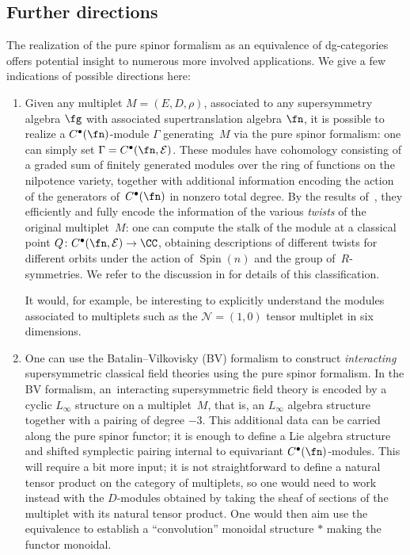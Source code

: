 \documentclass[10pt,a4paper]{amsart}
\numberwithin{equation}{section}
\def\cE{\mathcal E}\def\cF{\mathcal F}\def\cG{\mathcal G}\def\cH{\mathcal H}
\def\bu{\bullet}
\DeclareMathOperator{\Spin}{Spin}
\begin{document}
\subsection*{Further directions}
The realization of the pure spinor formalism as an equivalence of dg-categories offers potential insight to numerous more involved applications. We give a few indications of possible directions here:
\begin{enumerate}\itemsep=0pt
	\item Given any multiplet $M=(E,D,\rho)$, associated to any supersymmetry algebra $\fg$ with associated supertranslation algebra $\fn$, it is possible to realize a $C^\bullet(\fn)$-module $\Gamma$ generating~$M$ via the pure spinor formalism: one can simply set $\Gamma = C^\bullet(\fn, \cE)$. These modules have cohomology consisting of a graded sum of finitely generated modules over the ring of functions on the nilpotence variety, together with additional information encoding the action of the generators of~$C^\bu(\fn)$ in nonzero total degree. By the results of~\cite{spinortwist}, they efficiently and fully encode the information of the various \emph{twists} of the original multiplet~$M$: one can compute the stalk of the module at a classical point $Q \colon C^\bullet(\fn, \cE) \to \CC$, obtaining descriptions of different twists for different orbits under the action of $\Spin(n)$ and the group of~$R$-symmetries. We refer to the discussion in \cite{NV, ElliottSafronov, ESW} for details of this classification.
	
	It would, for example, be interesting to explicitly understand the modules associated to multiplets such as the $\mathcal N = (1,0)$ tensor multiplet in six dimensions.
	
	\item One can use the Batalin--Vilkovisky (BV) formalism to construct \emph{interacting} supersymmetric classical field theories using the pure spinor formalism. In the BV formalism, an~interacting supersymmetric field theory is encoded by a cyclic $L_\infty$ structure on a multiplet~$M$, that is, an $L_\infty$ algebra structure together with a pairing of degree $-3$. This additional data can be carried along the pure spinor functor; it is enough to define a Lie algebra structure and shifted symplectic pairing internal to equivariant $C^\bullet(\fn)$-modules. This will require a bit more input; it is not straightforward to define a natural tensor product on the category of multiplets, so one would need to work instead with the $D$-modules obtained by taking the sheaf of sections of the multiplet with its natural tensor product. One would then aim use the equivalence to establish a ``convolution'' monoidal structure $\ast$ making the functor monoidal.
	

\end{enumerate}
\end{document}
